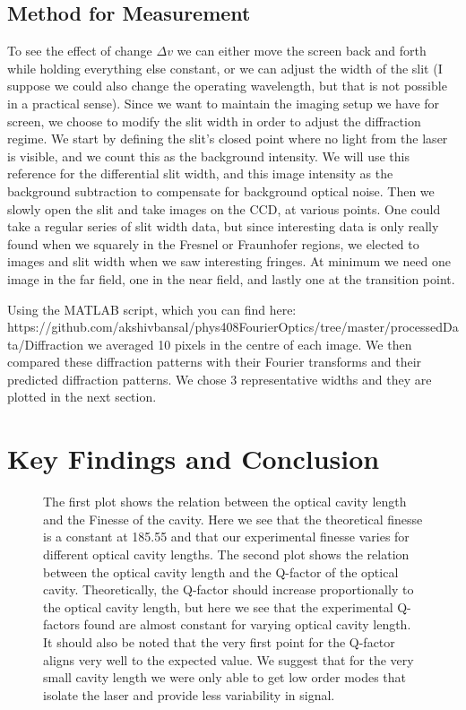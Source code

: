 \documentclass[11pt]{article}
\begin{document}
\subsection{Method for Measurement}
To see the effect of change $\Delta v$ we can either move the screen back and forth while holding everything else constant, or we can adjust the width of the slit (I suppose we could also change the operating wavelength, but that is not possible in a practical sense). Since we want to maintain the imaging setup we have for screen, we choose to modify the slit width in order to adjust the diffraction regime. We start by defining the slit’s closed point where no light from the laser is visible, and we count this as the background intensity. We will use this reference for the differential slit width, and this image intensity as the background subtraction to compensate for background optical noise. Then we slowly open the slit and take images on the CCD, at various points. One could take a regular series of slit width data, but since interesting data is only really found when we squarely in the Fresnel or Fraunhofer regions, we elected to images and slit width when we saw interesting fringes. At minimum we need one image in the far field, one in the near field, and lastly one at the transition point. 

Using the MATLAB script, which you can find here: https://github.com/akshivbansal/phys408FourierOptics/tree/master/processedData/Diffraction we averaged 10 pixels in the centre of each image. We then compared these diffraction patterns with their Fourier transforms and their predicted diffraction patterns. We chose 3 representative widths and they are plotted in the next section. 

\section{Key Findings and Conclusion}
\vspace{-8mm}

\begin{center}
	\begin{figure}[H]
	\centering
	\caption{The first plot shows the relation between the optical cavity length and the Finesse of the cavity. Here we see that the theoretical finesse is a constant at 185.55 and that our experimental finesse varies for different optical cavity lengths.
The second plot shows the relation between the optical cavity length and the Q-factor of the optical cavity.  Theoretically, the Q-factor should increase proportionally to the optical cavity length, but here we see that the experimental Q-factors found are almost constant for varying optical cavity length. It should also be noted that the very first point for the Q-factor aligns very well to the expected value. We suggest that for the very small cavity length we were only able to get low order modes that isolate the laser and provide less variability in signal.}
	\end{figure}
\end{center}
\vspace{-6mm} 
\end{document}

